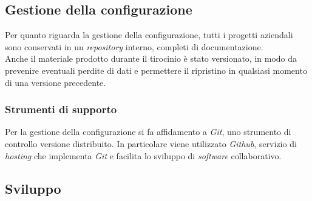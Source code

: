 \subsection{Gestione della configurazione}

Per quanto riguarda la gestione della configurazione, tutti i progetti aziendali sono conservati in un \textit{repository} interno, completi di documentazione. \\
Anche il materiale prodotto durante il tirocinio è stato versionato, in modo da prevenire eventuali perdite di dati e permettere il ripristino in qualsiasi momento di una versione precedente.


\subsubsection{Strumenti di supporto}
Per la gestione della configurazione si fa affidamento a \textit{Git}, uno strumento di controllo versione distribuito. In particolare viene utilizzato \textit{Github}, servizio di \textit{hosting} che implementa \textit{Git} e facilita lo sviluppo di \textit{software} collaborativo.


\subsection{Sviluppo}

